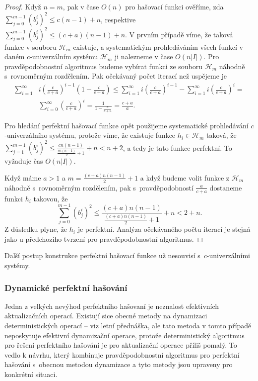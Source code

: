 \documentclass[a4paper,12pt]{article}
\begin{document}
\begin{proof}Když $n=m$, pak v čase $O(n)$ pro  
hašovací funkci ověříme, zda $\sum_{j=0}^{m-1}(b^
i_j)^2\le c(n-1)+n$, respektive 
$\sum_{j=0}^{m-1}(b^i_j)^2\le (c+a)(n-1)+n$.  V prvním případě víme, že taková 
funkce v souboru $\mathcal H_m$ existuje, a systematickým prohledáváním 
všech funkcí v daném $c$-univerzálním systému $\mathcal H_
m$ ji nalezneme 
v čase $O(n|I|)$.  Pro pravděpodobnostní algoritmus budeme 
vybírat funkci ze souboru $\mathcal H_m$ náhodně s~rovnoměrným 
rozdělením.  Pak očekávaný počet iterací než uspějeme je 
\begin{align*}\sum_{i=1}^{\infty}&i(\frac c{c+a})^{i-1}(1-\frac c{c+a})
\le\sum_{i=1}^{\infty}i(\frac c{c+a})^{i-1}-\sum_{i=1}^{\infty}i(\frac 
c{c+a})^i=\\
&\sum_{i=0}^{\infty}(\frac c{c+a})^i=\frac 1{1-\frac c{c+a}}=\frac {c
+a}a.\end{align*}

Pro hledání perfektní hašovací funkce opět použijeme 
syste\-ma\-tické prohledávání $c$-univer\-zál\-ního systému, protože 
víme, že existuje funkce $h_i\in \mathcal H_m$ taková, že 
$\sum_{j=1}^{m-1}(b^i_j)^2\le\frac {cn(n-1)}{\frac {cn(n-1)}2+1}+
n<n+2$, a tedy je tato funkce perfektní. 
To vyžaduje čas $O(n|I|)$. 

Když máme $a>1$ a $m=\frac {(c+a)n(n-1)}2+1$ 
a když budeme volit funkce z $\mathcal H_m$ 
náhodně s~rovnoměrným rozdělením, pak s~pravděpodobností 
$\frac a{c+a}$ do\-sta\-ne\-me funkci $h_i$ takovou, že 
$$\sum_{j=0}^{m-1}(b^i_j)^2\le\frac {(c+a)n(n-1)}{\frac {(c+a)n(n
-1)}2+1}+n<2+n.$$
Z důsledku plyne, že $h_i$ je perfektní.  Analýza 
očekávaného počtu iterací je stejná jako u předchozího tvrzení 
pro pravděpodobnostní algoritmus. 
\end{proof}

Další postup konstrukce perfektní hašovací funkce už 
nesouvisí s~$c$-univerzálními systémy. 

\subsubsection{Dynamické perfektní hašování}

Jedna z velkých nevýhod perfektního hašovaní je 
neznalost efektivních aktualizačních ope\-rací. Existují sice 
obecné meto\-dy na dynamizaci deterministických operací -- viz 
letní přednáš\-ka, ale tato metoda v tomto případě neposkytuje 
efektivní dynamizační operace, protože deterministický 
algoritmus pro ře\-še\-ní perfektního hašování je pro 
aktualizační ope\-race příliš pomalý. To vedlo k návrhu, 
který kombinuje pravděpodobnostní algoritmus pro perfektní 
hašování s~obecnou metodou dynami\-za\-ce a tyto metody jsou 
upraveny pro konkrétní situaci. 
\end{document}
